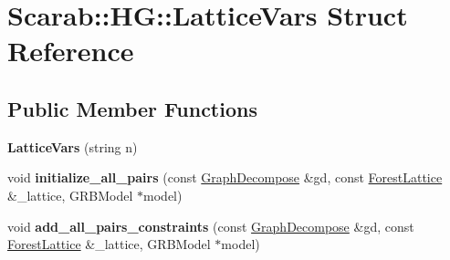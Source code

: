 \hypertarget{struct_scarab_1_1_h_g_1_1_lattice_vars}{
\section{Scarab::HG::LatticeVars Struct Reference}
\label{struct_scarab_1_1_h_g_1_1_lattice_vars}
}
\subsection*{Public Member Functions}
\begin{DoxyCompactItemize}
\item 
\hypertarget{struct_scarab_1_1_h_g_1_1_lattice_vars_a22dc8ef683d47635b8e55adf3520a811}{
{\bfseries LatticeVars} (string n)}
\label{struct_scarab_1_1_h_g_1_1_lattice_vars_a22dc8ef683d47635b8e55adf3520a811}

\item 
\hypertarget{struct_scarab_1_1_h_g_1_1_lattice_vars_a2b1a31d5b8d9673c7c473f28c2e02db9}{
void {\bfseries initialize\_\-all\_\-pairs} (const \hyperlink{class_graph_decompose}{GraphDecompose} \&gd, const \hyperlink{class_forest_lattice}{ForestLattice} \&\_\-lattice, GRBModel $\ast$model)}
\label{struct_scarab_1_1_h_g_1_1_lattice_vars_a2b1a31d5b8d9673c7c473f28c2e02db9}

\item 
\hypertarget{struct_scarab_1_1_h_g_1_1_lattice_vars_a769802ee94dab4d0c8a7956fb861efac}{
void {\bfseries add\_\-all\_\-pairs\_\-constraints} (const \hyperlink{class_graph_decompose}{GraphDecompose} \&gd, const \hyperlink{class_forest_lattice}{ForestLattice} \&\_\-lattice, GRBModel $\ast$model)}
\label{struct_scarab_1_1_h_g_1_1_lattice_vars_a769802ee94dab4d0c8a7956fb861efac}

\end{DoxyCompactItemize}
